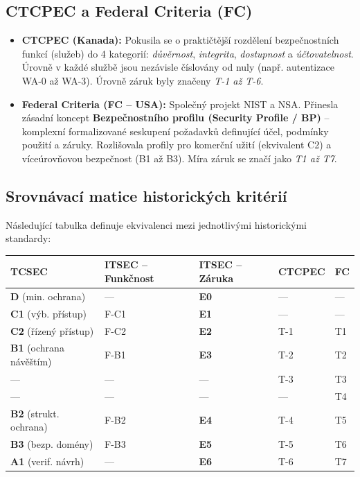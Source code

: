 \documentclass[10pt,a4paper]{article}
\begin{document}
	\subsection{CTCPEC a Federal Criteria (FC)}
	\begin{itemize}
		\item \textbf{CTCPEC (Kanada):} Pokusila se o praktičtější rozdělení bezpečnostních funkcí (služeb) do 4 kategorií: \textit{důvěrnost}, \textit{integrita}, \textit{dostupnost} a \textit{účtovatelnost}. 
		Úrovně v každé službě jsou nezávisle číslovány od nuly (např. autentizace WA-0 až WA-3). Úrovně záruk byly značeny \textit{T-1 až T-6}. 
		
		\item \textbf{Federal Criteria (FC -- USA):} Společný projekt NIST a NSA. Přinesla zásadní koncept \textbf{Bezpečnostního profilu (Security Profile / BP)} -- komplexní formalizované seskupení požadavků definující účel, podmínky použití a záruky. Rozlišovala profily pro komerční užití (ekvivalent C2) a víceúrovňovou bezpečnost (B1 až B3). Míra záruk se značí jako \textit{T1 až T7}.
	\end{itemize}
	
	\subsection{Srovnávací matice historických kritérií}
	Následující tabulka definuje ekvivalenci mezi jednotlivými historickými standardy:
	
	\begin{center}
		\begin{tabular}{|l|l|l|l|l|}
			\hline
			\textbf{TCSEC} & \textbf{ITSEC -- Funkčnost} & \textbf{ITSEC -- Záruka} & \textbf{CTCPEC} & \textbf{FC} \\ \hline
			\textbf{D} (min. ochrana) & --- & \textbf{E0} & --- & --- \\ \hline
			\textbf{C1} (výb. přístup) & F-C1 & \textbf{E1} & --- & --- \\ \hline
			\textbf{C2} (řízený přístup) & F-C2 & \textbf{E2} & T-1 & T1 \\ \hline
			\textbf{B1} (ochrana návěštím) & F-B1 & \textbf{E3} & T-2 & T2 \\ \hline
			--- & --- & --- & T-3 & T3 \\ \hline
			--- & --- & --- & --- & T4 \\ \hline
			\textbf{B2} (strukt. ochrana) & F-B2 & \textbf{E4} & T-4 & T5 \\ \hline
			\textbf{B3} (bezp. domény) & F-B3 & \textbf{E5} & T-5 & T6 \\ \hline
			\textbf{A1} (verif. návrh) & --- & \textbf{E6} & T-6 & T7 \\ \hline
		\end{tabular}
	\end{center}
\end{document}
